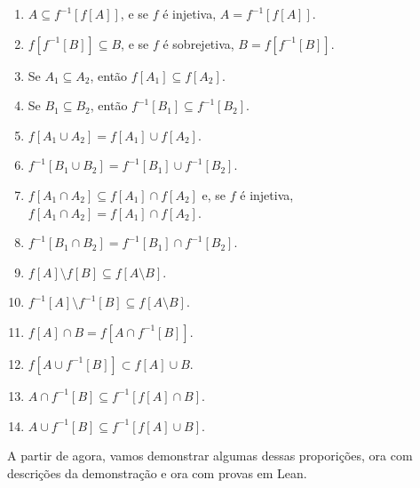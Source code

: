 \begin{enumerate}
    \item $A \subseteq f^{-1}[f[A]]$, e se $f$ é injetiva, $A = f^{-1}[f[A]]$.
    \item $f[f^{-1}[B]] \subseteq B$, e se $f$ é sobrejetiva, $B = f[f^{-1}[B]]$.
    \item Se $A_1 \subseteq A_2$, então $f[A_1] \subseteq f[A_2]$.
    \item Se $B_1 \subseteq B_2$, então $f^{-1}[B_1] \subseteq f^{-1}[B_2]$.
    \item $f[A_1 \cup A_2] = f[A_1] \cup f[A_2]$.
    \item $f^{-1}[B_1 \cup B_2] = f^{-1}[B_1] \cup f^{-1}[B_2]$.
    \item $f[A_1 \cap A_2] \subseteq f[A_1] \cap f[A_2]$ e, se $f$ é injetiva, $f[A_1 \cap A_2] = f[A_1] \cap f[A_2]$.
    \item $f^{-1}[B_1 \cap B_2] = f^{-1}[B_1] \cap f^{-1}[B_2]$.
    \item $f[A] \setminus f[B] \subseteq f[A\setminus B]$.
    \item $f^{-1}[A] \setminus f^{-1}[B] \subseteq f[A \setminus B]$.
    \item $f[A] \cap B = f[A \cap f^{-1}[B]]$.
    \item $f[A \cup f^{-1}[B]] \subset f[A] \cup B $.
    \item $A \cap f^{-1}[B] \subseteq f^{-1}[f[A] \cap B]$.
    \item $A \cup f^{-1}[B] \subseteq f^{-1}[f[A] \cup B]$.
\end{enumerate}

A partir de agora, vamos demonstrar algumas dessas proporições, ora 
com descrições da demonstração e ora com provas em Lean. 
